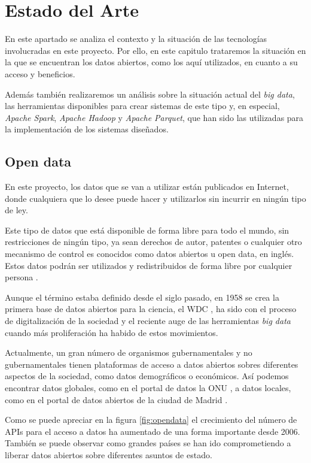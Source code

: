 \chapter{Estado del Arte\label{sec:estado_del_arte}}

En este apartado se analiza el contexto y la situación de las tecnologías involucradas en este proyecto. Por ello, en este capitulo trataremos la situación en la que se encuentran los datos abiertos, como los aquí utilizados, en cuanto a su acceso y beneficios. 

Además también realizaremos un análisis sobre la situación actual del \textit{big data}, las herramientas disponibles para crear sistemas de este tipo y, en especial, \textit{Apache Spark}, \textit{Apache Hadoop} y \textit{Apache Parquet}, que han sido las utilizadas para la implementación de los sistemas diseñados.

\section{Open data}

En este proyecto, los datos que se van a utilizar están publicados en Internet, donde cualquiera que lo desee puede hacer y utilizarlos sin incurrir en ningún tipo de ley.

Este tipo de datos que está disponible de forma libre para todo el mundo, sin restricciones de ningún tipo, ya sean derechos de autor, patentes o cualquier otro mecanismo de control es conocidos como datos abiertos u open data, en inglés. Estos datos podrán ser utilizados y redistribuidos de forma libre por cualquier persona \cite{opendata}.

Aunque el término estaba definido desde el siglo pasado, en 1958 se crea la primera base de datos abiertos para la ciencia, el \gls{WDC} \cite{wdc}, ha sido con el proceso de digitalización de la sociedad y el  reciente auge de las herramientas \textit{big data} cuando más proliferación ha habido de estos movimientos.

Actualmente, un gran número de organismos gubernamentales y no gubernamentales tienen plataformas de acceso a datos abiertos sobres diferentes aspectos de la sociedad, como datos demográficos o económicos. Así podemos encontrar datos globales, como en el portal de datos la \gls{ONU} \cite{onudata}, a datos locales, como en el portal de datos abiertos de la ciudad de Madrid \cite{datosMadrid}.

Como se puede apreciar en la figura \ref{fig:opendata} el crecimiento del número de APIs para el acceso a datos ha aumentado de una forma importante desde 2006. También se puede observar como grandes países se han ido comprometiendo a liberar datos abiertos sobre diferentes asuntos de estado.

